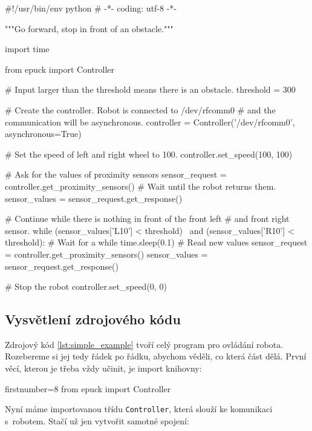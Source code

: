 \begin{mylisting}
\begin{pyc}
#!/usr/bin/env python
# -*- coding: utf-8 -*-

"""Go forward, stop in front of an obstacle."""

import time

from epuck import Controller

# Input larger than the threshold means there is an obstacle.
threshold = 300

# Create the controller. Robot is connected to /dev/rfcomm0
# and the communication will be asynchronous.
controller = Controller('/dev/rfcomm0', asynchronous=True)

# Set the speed of left and right wheel to 100.
controller.set_speed(100, 100)

# Ask for the values of proximity sensors
sensor_request = controller.get_proximity_sensors()
# Wait until the robot returns them.
sensor_values = sensor_request.get_response()

# Continue while there is nothing in front of the front left
# and front right sensor.
while (sensor_values['L10'] < threshold) \
       and (sensor_values['R10'] < threshold):
    # Wait for a while
    time.sleep(0.1)
    # Read new values
    sensor_request = controller.get_proximity_sensors()
    sensor_values = sensor_request.get_response()

# Stop the robot
controller.set_speed(0, 0)
\end{pyc}
\label{lst:simple_example}
\end{mylisting}

\subsection{Vysvětlení zdrojového kódu}

    Zdrojový kód \ref{lst:simple_example} tvoří celý program pro ovládání
    robota. Rozebereme si jej tedy řádek po řádku, abychom věděli, co která
    část dělá. První věcí, kterou je třeba vždy učinit, je import knihovny:

    \begin{pyc*}{firstnumber=8}
from epuck import Controller
    \end{pyc*}

    Nyní máme importovanou třídu {\tt Controller}, která slouží ke komunikaci
    s~robotem. Stačí už jen vytvořit samotné spojení:

